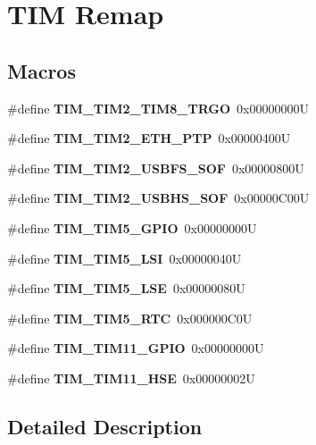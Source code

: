 \hypertarget{group___t_i_m_ex___remap}{}\section{T\+IM Remap}
\label{group___t_i_m_ex___remap}
\subsection*{Macros}
\begin{DoxyCompactItemize}
\item 
\mbox{\label{group___t_i_m_ex___remap_ga3dbfe224567e0b568859a4c749c83d1c}} 
\#define {\bfseries T\+I\+M\+\_\+\+T\+I\+M2\+\_\+\+T\+I\+M8\+\_\+\+T\+R\+GO}~0x00000000U
\item 
\mbox{\label{group___t_i_m_ex___remap_ga63b5bc00517eecfa1dbf6b7d7cf56135}} 
\#define {\bfseries T\+I\+M\+\_\+\+T\+I\+M2\+\_\+\+E\+T\+H\+\_\+\+P\+TP}~0x00000400U
\item 
\mbox{\label{group___t_i_m_ex___remap_ga263984d585fd682730d3199da47dd803}} 
\#define {\bfseries T\+I\+M\+\_\+\+T\+I\+M2\+\_\+\+U\+S\+B\+F\+S\+\_\+\+S\+OF}~0x00000800U
\item 
\mbox{\label{group___t_i_m_ex___remap_ga8e47d56e9e9c9583b85a4c7b9f98931a}} 
\#define {\bfseries T\+I\+M\+\_\+\+T\+I\+M2\+\_\+\+U\+S\+B\+H\+S\+\_\+\+S\+OF}~0x00000\+C00U
\item 
\mbox{\label{group___t_i_m_ex___remap_ga8525d77a5f6fea05530e812e991e4d6d}} 
\#define {\bfseries T\+I\+M\+\_\+\+T\+I\+M5\+\_\+\+G\+P\+IO}~0x00000000U
\item 
\mbox{\label{group___t_i_m_ex___remap_ga62000fc12a4ed5909723b881533a2f93}} 
\#define {\bfseries T\+I\+M\+\_\+\+T\+I\+M5\+\_\+\+L\+SI}~0x00000040U
\item 
\mbox{\label{group___t_i_m_ex___remap_ga9f09de021d2f68730c952b4f0ebb82bc}} 
\#define {\bfseries T\+I\+M\+\_\+\+T\+I\+M5\+\_\+\+L\+SE}~0x00000080U
\item 
\mbox{\label{group___t_i_m_ex___remap_ga93e312581ffb28601b36b4f8b240df79}} 
\#define {\bfseries T\+I\+M\+\_\+\+T\+I\+M5\+\_\+\+R\+TC}~0x000000\+C0U
\item 
\mbox{\label{group___t_i_m_ex___remap_gac8a0bac87924350651da1957081bc9ae}} 
\#define {\bfseries T\+I\+M\+\_\+\+T\+I\+M11\+\_\+\+G\+P\+IO}~0x00000000U
\item 
\mbox{\label{group___t_i_m_ex___remap_ga3b08e8165670e3034401099aada7712d}} 
\#define {\bfseries T\+I\+M\+\_\+\+T\+I\+M11\+\_\+\+H\+SE}~0x00000002U
\end{DoxyCompactItemize}


\subsection{Detailed Description}
